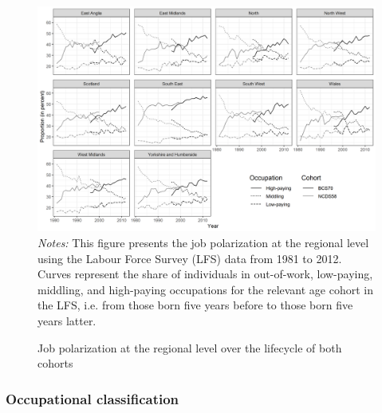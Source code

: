 \begin{figure}[!htb]
    \centering
    \caption{Job polarization at the regional level over the lifecycle of both cohorts}
    \label{chap2-fig:lfs-regional}
    \includegraphics[width=\linewidth]{chap2/graphic/lfs-regional.png}
	\vspace{-3em}
	\justify\singlespacing\footnotesize{\textit{Notes:} This figure presents the job polarization at the regional level using the Labour Force Survey (LFS) data from 1981 to 2012. Curves represent the share of individuals in out-of-work, low-paying, middling, and high-paying occupations for the relevant age cohort in the LFS, i.e. from those born five years before to those born five years latter.}
\end{figure}

\subsubsection{Occupational classification}\label{chap2-app-data-classification}

